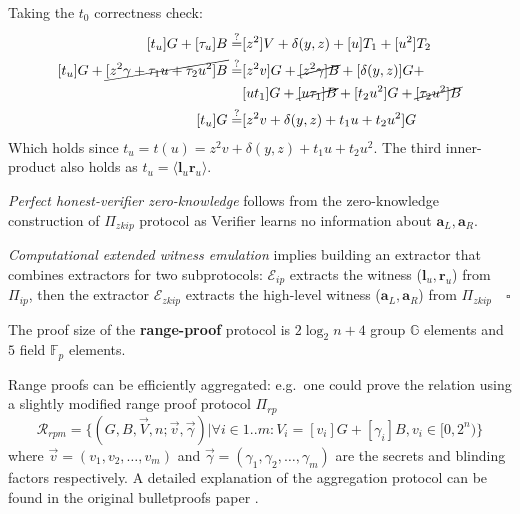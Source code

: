 \documentclass[../../book.tex]{subfiles}
\begin{document}
Taking the $t_0$ correctness check:
\begin{equation*}
    \begin{aligned}
        [t_u]G + [\tau_u]B \stackrel{\text{?}}{=}& [z^2]V + \delta(y,z) + [u]T_1 + [u^2]T_2\\
        [t_u]G + \cancel{[z^2\gamma + \tau_1 u + \tau_2 u^2]B} \stackrel{?}{=}& [z^2 v]G + \cancel{[z^2 \gamma]B} +[\delta(y,z)]G + \\
        & [ut_1]G + \cancel{[u\tau_1]B} + [t_2 u^2] G + \cancel{[\tau_2 u^2]B} \\
        [t_u]G \stackrel{?}{=}& [z^2v + \delta(y,z) + t_1u + t_2u^2]G
    \end{aligned}
\end{equation*}
Which holds since $t_u = t(u) = z^2v + \delta(y,z) + t_1u + t_2u^2$. The third inner-product also holds as $t_u = \langle \mathbf{l}_u \mathbf{r}_u \rangle$.

\textit{Perfect honest-verifier zero-knowledge} follows from the zero-knowledge construction of $\Pi_{zkip}$ protocol as Verifier learns no information about $\mathbf{a}_L, \mathbf{a}_R$.

\textit{Computational extended witness emulation} implies building an extractor that combines extractors for two subprotocols: $\mathcal{E}_{ip}$ extracts the witness ($\mathbf{l}_u, \mathbf{r}_u$) from $\Pi_{ip}$, then the extractor $\mathcal{E}_{zkip}$ extracts the high-level witness ($\mathbf{a}_L, \mathbf{a}_R$) from $\Pi_{zkip} \quad \square$

The proof size of the \textbf{range-proof} protocol is $2 \log_2n +4$ group $\mathbb{G}$ elements and $5$ field $\mathbb{F}_p$ elements.
\begin{remark}
    Range proofs can be efficiently aggregated: e.g.\ one could prove the relation using a slightly modified range proof protocol $\Pi_{rp}$
    $$\mathcal{R}_{rpm} = \{ (G, B, \vec{V}, n; \vec{v}, \vec{\gamma}) \vert \forall i \in 1..m: V_i = [v_i]G + [\gamma_i]B, v_i \in [0, 2^n) \}$$
    where $\vec{v} = (v_1, v_2, \dots, v_m)$ and $\vec{\gamma} = (\gamma_1, \gamma_2, \dots, \gamma_m)$ are the secrets and blinding factors respectively. A detailed explanation of the aggregation protocol can be found in the original bulletproofs paper \cite{bulletproofs}.
\end{remark}
\end{document}
